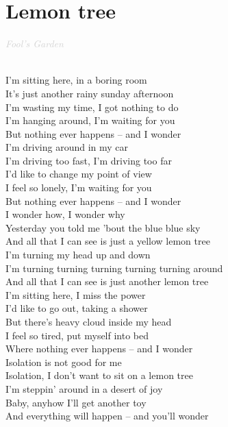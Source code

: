 \documentclass[a5paper, 10pt]{book}
\begin{document}
\section{Lemon tree}\textcolor{lightgray}{\textit{Fool's Garden}}\\~\\
\begin{minipage}[t]{0.8\textwidth}
I'm sitting here, in a boring room \\
It's just another rainy sunday afternoon\\
I'm wasting my time, I got nothing to do\\
I'm hanging around, I'm waiting for you\\
But nothing ever happens – and I wonder\\

I'm driving around in my car\\
I'm driving too fast, I'm driving too far\\
I'd like to change my point of view\\
I feel so lonely, I'm waiting for you\\
But nothing ever happens – and I wonder\\

\hspace*{5mm}I wonder how, I wonder why\\
\hspace*{5mm}Yesterday you told me 'bout the blue blue sky \\
\hspace*{5mm}And all that I can see is just a yellow lemon tree\\

\hspace*{5mm}I'm turning my head up and down\\
\hspace*{5mm}I'm turning turning turning turning turning around\\
\hspace*{5mm}And all that I can see is just another lemon tree\\

I'm sitting here, I miss the power \\
I'd like to go out, taking a shower\\
But there's heavy cloud inside my head\\
I feel so tired, put myself into bed\\
Where nothing ever happens – and I wonder \\

\hspace*{3mm}Isolation is not good for me\\
\hspace*{3mm}Isolation, I don't want to sit on a lemon tree \\

I'm steppin' around in a desert of joy\\
Baby, anyhow I'll get another toy\\
And everything will happen – and you'll wonder\\

\end{minipage}
\end{document}
